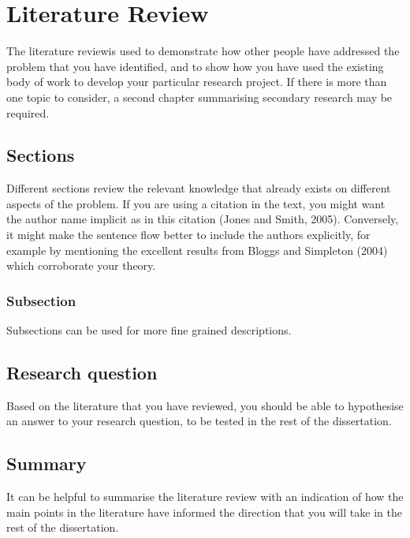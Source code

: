 \chapter{Literature Review}
The literature review\footnotemark is used to demonstrate how other people have addressed the problem that you have identified, and to show how you have used the existing body of work to develop your particular research project. If there is more than one topic to consider, a second chapter summarising secondary research may be required.

\section{Sections}
Different sections review the relevant knowledge that already exists on different aspects of the problem. If you are using a citation in the text, you might want the author name implicit as in this citation (Jones and Smith, 2005). Conversely, it might make the sentence flow better to include the authors explicitly, for example by mentioning the excellent results from Bloggs and Simpleton (2004) which corroborate your theory.
\subsection{Subsection}
Subsections can be used for more fine grained descriptions.
	
\section{Research question}
Based on the literature that you have reviewed, you should be able to hypothesise an answer to your research question, to be tested in the rest of the dissertation.


\section{Summary}
It can be helpful to summarise the literature review with an indication of how the main points in the literature have informed the direction that you will take in the rest of the dissertation.

